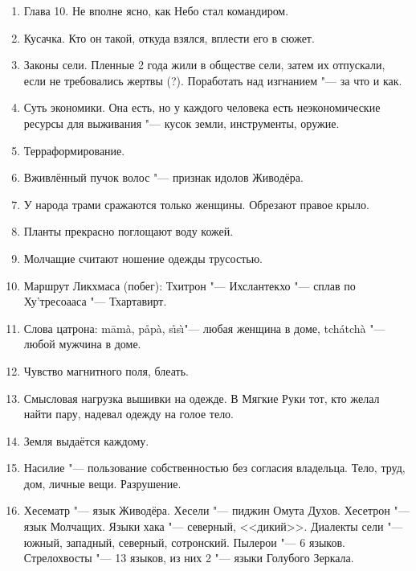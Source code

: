 \begin{enumerate}
\item Глава 10.
Не вполне ясно, как Небо стал командиром.

\item Кусачка.
Кто он такой, откуда взялся, вплести его в сюжет.

\item Законы сели.
Пленные 2 года жили в обществе сели, затем их отпускали, если не требовались жертвы (?).
Поработать над изгнанием "--- за что и как.

\item Суть экономики.
Она есть, но у каждого человека есть неэкономические ресурсы для выживания "--- кусок земли, инструменты, оружие.

\item Терраформирование.

\item Вживлённый пучок волос "--- признак идолов Живодёра.

\item У народа трами сражаются только женщины.
Обрезают правое крыло.

\item Планты прекрасно поглощают воду кожей.

\item Молчащие считают ношение одежды трусостью.

\item Маршрут Ликхмаса (побег): Тхитрон "--- Ихслантекхо "--- сплав по Ху'тресоааса "--- Тхартавирт.

\item Слова цатрона: m\=am\`a, p\r{a}p\`a, s\r{\i}s\`\i "--- любая женщина в доме, tch\'atch\`a "--- любой мужчина в доме.

\item Чувство магнитного поля, блеать.

\item Смысловая нагрузка вышивки на одежде.
В Мягкие Руки тот, кто желал найти пару, надевал одежду на голое тело.

\item Земля выдаётся каждому.

\item Насилие "--- пользование собственностью без согласия владельца.
Тело, труд, дом, личные вещи.
Разрушение.

\item Хесематр "--- язык Живодёра.
Хесели "--- пиджин Омута Духов.
Хесетрон "--- язык Молчащих.
Языки хака "--- северный, <<дикий>>.
Диалекты сели "--- южный, западный, северный, сотронский.
Пылерои "--- 6 языков. Стрелохвосты "--- 13 языков, из них 2 "--- языки Голубого Зеркала.
\end{enumerate}

